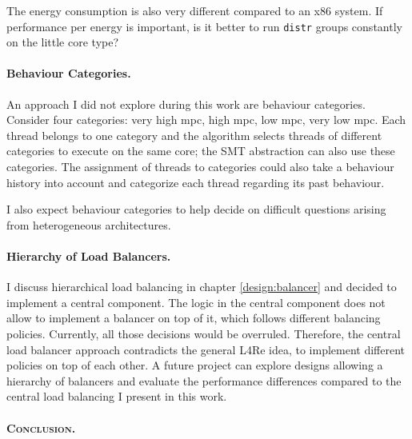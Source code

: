 The energy consumption is also very different compared to an x86 system.
If performance per energy is important, is it better to run \texttt{distr} groups
constantly on the little core type?


\paragraph{Behaviour Categories.}
An approach I did not explore during this work are behaviour categories.
Consider four categories: very high \gls{mpc}, high \gls{mpc}, low \gls{mpc},
very low \gls{mpc}.
Each thread belongs to one category and the algorithm selects threads of
different categories to execute on the same core; the SMT abstraction can also
use these categories.
The assignment of threads to categories could also take a behaviour history
into account and categorize each thread regarding its past behaviour.

I also expect behaviour categories to help decide on difficult questions
arising from heterogeneous architectures.

\paragraph{Hierarchy of Load Balancers.}
I discuss hierarchical load balancing in chapter \ref{design:balancer} and
decided to implement a central component.
The logic in the central component does not allow to implement a
balancer on top of it, which follows different balancing policies.
Currently, all those decisions would be overruled.
Therefore, the central load balancer approach contradicts the general L4Re
idea, to implement different policies on top of each other.
A future project can explore designs allowing a hierarchy of balancers and
evaluate the performance differences compared to the central load balancing I
present in this work.

\begin{comment}
\paragraph{Workload-Aware Balancing.}
The modular approach allows quick replacement and testing of different
algorithms in the various components.
If very specific workloads run on the system, tuned balancing algorithms for
this specific workload can be used to increase the performance of the system.
\end{comment}

\paragraph{\large{}\scshape Conclusion.\newline}


